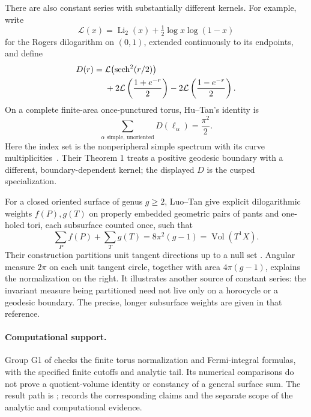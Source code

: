 There are also constant series with substantially different kernels.
For example, write
\[
 \mathcal L(x)=\operatorname{Li}_2(x)+\tfrac12\log x\log(1-x)
\]
for the Rogers dilogarithm on $(0,1)$, extended continuously to its
endpoints, and define
\begin{align*}
 D(r)={}&\mathcal L\bigl(\operatorname{sech}^2(r/2)\bigr)\\
 &+2\mathcal L\left(\frac{1+e^{-r}}2\right)
  -2\mathcal L\left(\frac{1-e^{-r}}2\right).
\end{align*}
On a complete finite-area once-punctured torus, Hu--Tan's identity is
\begin{equation}
 \sum_{\alpha\text{ simple, unoriented}}D(\ell_\alpha)=\frac{\pi^2}{2}.
 \label{eq:dilogtorus}
\end{equation}
Here the index set is the nonperipheral simple spectrum with its curve
multiplicities~\cite[Theorem 2, equation (2)]{HuTan}. Their Theorem 1
treats a positive geodesic boundary with a different, boundary-dependent
kernel; the displayed $D$ is the cusped specialization.

For a closed oriented surface of genus $g\ge2$, Luo--Tan give explicit
dilogarithmic weights $f(P),g(T)$ on properly embedded geometric pairs of
pants and one-holed tori, each subsurface counted once,
such that
\begin{equation}
 \sum_P f(P)+\sum_T g(T)=8\pi^2(g-1)=\operatorname{Vol}(T^1X).
 \label{eq:luotan}
\end{equation}
Their construction partitions unit tangent directions up to a null set
\cite[Theorem 1.1 and Section 1.2]{LuoTan}. Angular measure $2\pi$ on
each unit tangent circle, together with area $4\pi(g-1)$, explains the
normalization on the right.
It illustrates another source of constant series: the invariant measure
being partitioned need not live only on a horocycle or a geodesic boundary.
The precise, longer subsurface weights are given in that reference.

\paragraph{Computational support.}
Group G1 of  checks
the finite torus normalization and Fermi-integral formulas, with the
specified finite cutoffs and analytic tail. Its numerical comparisons
do not prove a quotient-volume identity or constancy of a general
surface sum. The result path is
;
 records the corresponding claims
and the separate scope of the analytic and computational evidence.
